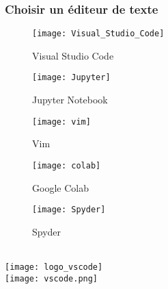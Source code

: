 \documentclass{beamer}
\theoremstyle{definition}
\begin{document}
\begin{frame}
	\frametitle{Choisir un éditeur de texte}
	\begin{minipage}[c]{1\linewidth}
		\begin{minipage}[c]{0.3\linewidth}		
		\begin{figure}
			\centering
			\texttt{[image: Visual\_Studio\_Code]}
			\caption*{Visual Studio Code}	
		\end{figure}
		\end{minipage}\hfil
	\begin{minipage}[c]{0.3\linewidth}		
		\begin{figure}
			\centering
			\texttt{[image: Jupyter]}
			\caption*{Jupyter Notebook}	
		\end{figure}
	\end{minipage}\hfil
	\begin{minipage}[c]{0.3\linewidth}		
		\begin{figure}
			\centering
			\texttt{[image: vim]}
			\caption*{Vim}	
		\end{figure}
	\end{minipage}
\end{minipage}
\begin{minipage}[c]{1\linewidth}
	\quad\quad
	\begin{minipage}[c]{0.4\linewidth}		
		\begin{figure}
			\centering
			\texttt{[image: colab]}
			\caption*{Google Colab}	
		\end{figure}
	\end{minipage}
	\begin{minipage}[c]{0.4\linewidth}		
		\begin{figure}
			\centering
			\texttt{[image: Spyder]}
			\caption*{Spyder}	
		\end{figure}
	\end{minipage}
\end{minipage}

\end{frame}
\begin{frame}
	\begin{minipage}[t]{1\linewidth}
	\hfill\\[-1.5cm]
	\centering
	\texttt{[image: logo\_vscode]}\\
	\texttt{[image: vscode.png]}

	\end{minipage}
\end{frame}
\end{document}
